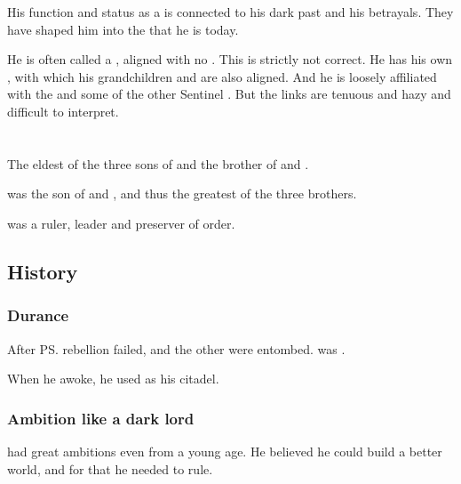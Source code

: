 His function and status as a \vertex{} is connected to his dark past and his betrayals. 
They have shaped him into the \vertex{} that he is today. 

He is often called a , aligned with no \matrix. 
This is strictly not correct. 
He has his own \matrix, with which his grandchildren and \Criseis{} are also aligned. 
And he is loosely affiliated with the  and some of the other Sentinel \matrices. 
But the links are tenuous and hazy and difficult to interpret. 















\section{\RaemythNexagglachel}
\index{\RaemythNexagglachel}
\index{\Nexagglachel}
The eldest of the three sons of \Tiamat and the brother of \Ishnaruchaefir{} and \Secherdamon.

\Nexagglachel was the son of \Tiamat and \Sethicus, and thus the greatest of the three brothers.

\Nexagglachel{} was a ruler, leader and preserver of order. 









\subsection{History}





\subsubsection{Durance}
After \ps{\Sethicus} rebellion failed, \Nexagglachel and the other \dragons were entombed. 
\Nexagglachel was . 

When he awoke, he used \Nithdornazsh as his citadel. 





\subsubsection{Ambition like a dark lord}
\Nexaggrael had great ambitions even from a young age. He believed he could build a better world, and for that he needed to rule. 

